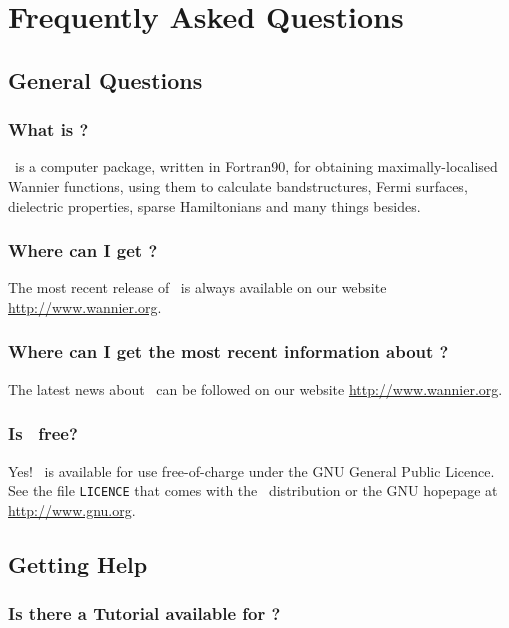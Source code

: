 \chapter{Frequently Asked Questions}\label{chap:faq}


\section{General Questions}

\subsection{What is \wannier?}

\wannier\ is a computer package, written in Fortran90, for obtaining
maximally-localised Wannier functions, using them to calculate
bandstructures, Fermi surfaces, dielectric properties, sparse
Hamiltonians and many things besides.

\subsection{Where can I get \wannier?}

The most recent release of \wannier\ is always available on our
website \url{http://www.wannier.org}.

\subsection{Where can I get the most recent information about
  \wannier?}

The latest news about \wannier\ can be followed on our website \url{http://www.wannier.org}.

\subsection{Is \wannier\ free?}

Yes! \wannier\ is available for use free-of-charge under the GNU
General Public Licence. See the file {\tt LICENCE} that comes with the
\wannier\ distribution or the GNU hopepage at \url{http://www.gnu.org}. 

\section{Getting Help}

\subsection{Is there a Tutorial available for \wannier?}

